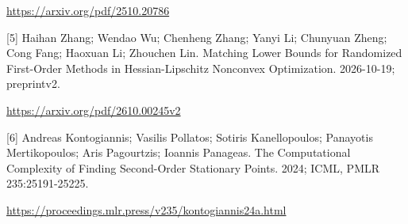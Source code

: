 \documentclass[10pt,a4paper]{article}
\begin{document}
\url{https://arxiv.org/pdf/2510.20786}

[5] Haihan Zhang; Wendao Wu; Chenheng Zhang; Yanyi Li; Chunyuan Zheng; Cong Fang; Haoxuan Li; Zhouchen Lin. Matching Lower Bounds for Randomized First-Order Methods in Hessian-Lipschitz Nonconvex Optimization. 2026-10-19; preprintv2.

\url{https://arxiv.org/pdf/2610.00245v2}

[6] Andreas Kontogiannis; Vasilis Pollatos; Sotiris Kanellopoulos; Panayotis Mertikopoulos; Aris Pagourtzis; Ioannis Panageas. The Computational Complexity of Finding Second-Order Stationary Points. 2024; ICML, PMLR 235:25191-25225.

\url{https://proceedings.mlr.press/v235/kontogiannis24a.html}
\end{document}
